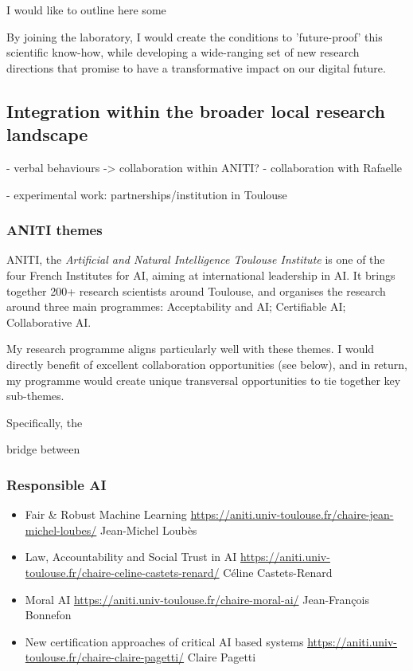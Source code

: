 I would like to outline here some

By joining the laboratory, I would create the conditions to
'future-proof' this scientific know-how, while developing a wide-ranging set of
new research directions that promise to have a transformative impact on our
digital future.

\newpage
\subsection{Integration within the broader local research landscape}\label{collaborations}


- verbal behaviours -> collaboration within ANITI?
- collaboration with Rafaelle

- experimental work: partnerships/institution in Toulouse


\subsubsection{ANITI themes}

ANITI, the \emph{Artificial and Natural Intelligence Toulouse Institute} is one
of the four French Institutes for AI, aiming at international leadership in AI.
It brings together 200+ research scientists around Toulouse, and organises the
research around three main programmes: Acceptability and AI; Certifiable AI;
Collaborative AI.

My research programme aligns particularly well with these themes. I would
directly benefit of excellent collaboration opportunities (see below), and in
return, my programme would create unique transversal opportunities to tie
together key sub-themes.

Specifically, the 

bridge between 

\subsubsection{Responsible AI}


\begin{itemize}
    \item Fair \& Robust Machine Learning
        \url{https://aniti.univ-toulouse.fr/chaire-jean-michel-loubes/}
Jean-Michel Loubès

\item Law, Accountability and Social Trust in AI
    \url{https://aniti.univ-toulouse.fr/chaire-celine-castets-renard/}
Céline Castets-Renard

\item Moral AI
    \url{https://aniti.univ-toulouse.fr/chaire-moral-ai/}
Jean-François Bonnefon

\item New certification approaches of critical AI based systems 
    \url{https://aniti.univ-toulouse.fr/chaire-claire-pagetti/}
Claire Pagetti

\end{itemize}

